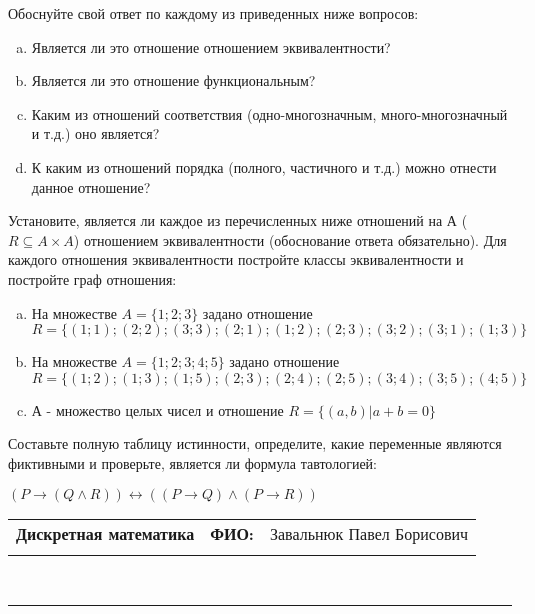 \documentclass[10pt]{exam}
\newcommand{\class}{Дискретная математика}
\newcommand{\examdate}{}
\begin{document}
\begin{questions}
Обоснуйте свой ответ по каждому из приведенных ниже вопросов:
\begin{enumerate} [a)]\setcounter{enumi}{0}
    \item Является ли это отношение отношением эквивалентности?
    \item Является ли это отношение функциональным?
    \item Каким из отношений соответствия (одно-многозначным, много-многозначный и т.д.) оно является?
    \item К каким из отношений порядка (полного, частичного и т.д.) можно отнести данное отношение?
\end{enumerate}
\question
Установите, является ли каждое из перечисленных ниже отношений на А ($R \subseteq A \times A$) отношением эквивалентности (обоснование ответа обязательно). Для каждого отношения эквивалентности постройте классы 
эквивалентности и постройте граф отношения:
\begin{enumerate} [a)]\setcounter{enumi}{0}
\item На множестве $A = \{1; 2; 3\}$ задано отношение $R = \{(1; 1); (2; 2); (3; 3); (2; 1); (1; 2); (2; 3); (3; 2); (3; 1); (1; 3)\}$
\item На множестве $A = \{1; 2; 3; 4; 5\}$ задано отношение $R = \{(1; 2); (1; 3); (1; 5); (2; 3); (2; 4); (2; 5); (3; 4); (3; 5); (4; 5)\}$
\item А - множество целых чисел и отношение $R = \{(a,b)|a + b = 0\}$
\end{enumerate}\question Составьте полную таблицу истинности, определите, какие переменные являются фиктивными и проверьте, является ли формула тавтологией:

$(P \rightarrow (Q \land R)) \leftrightarrow ((P \rightarrow Q) \land (P \rightarrow R))$

\end{questions}
\newpage
\begin{flushright}
\begin{tabular}{p{2.8in} r l}
\textbf{\class} & \textbf{ФИО:} &Завальнюк Павел Борисович
\\

\textbf{\examdate} &&\\
\end{tabular}\\
\end{flushright}
\rule[1ex]{\textwidth}{.1pt}
\end{document}
